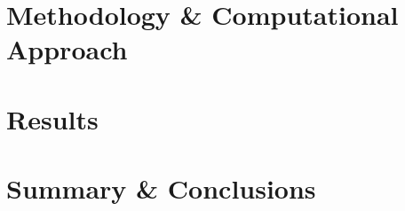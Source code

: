 \documentclass[12pt, oneside]{book}
\begin{document}
 
  

 
 
% 


\part{Methodology \& Computational Approach}\label{part:method}




\part{Results}\label{part:results}




\part{Summary \& Conclusions}\label{part:summary}


\end{document}
